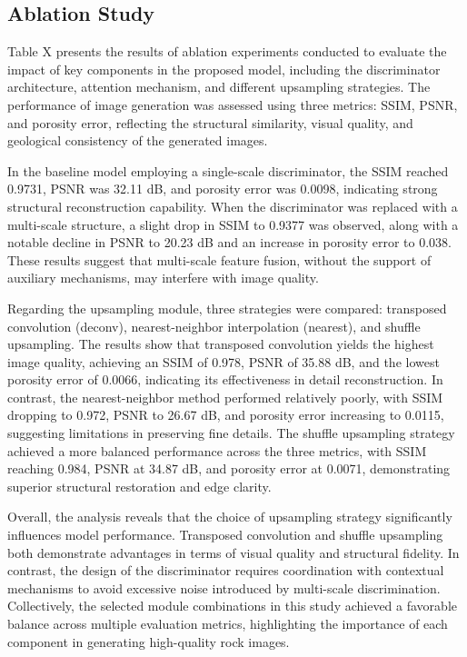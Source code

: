 \documentclass[a4paper,fleqn]{cas-sc}
\begin{document}
\subsection{Ablation Study}
Table X presents the results of ablation experiments conducted to evaluate the impact of key components in the proposed model, including the discriminator architecture, attention mechanism, and different upsampling strategies. The performance of image generation was assessed using three metrics: SSIM, PSNR, and porosity error, reflecting the structural similarity, visual quality, and geological consistency of the generated images.

In the baseline model employing a single-scale discriminator, the SSIM reached 0.9731, PSNR was 32.11 dB, and porosity error was 0.0098, indicating strong structural reconstruction capability. When the discriminator was replaced with a multi-scale structure, a slight drop in SSIM to 0.9377 was observed, along with a notable decline in PSNR to 20.23 dB and an increase in porosity error to 0.038. These results suggest that multi-scale feature fusion, without the support of auxiliary mechanisms, may interfere with image quality.

Regarding the upsampling module, three strategies were compared: transposed convolution (deconv), nearest-neighbor interpolation (nearest), and shuffle upsampling. The results show that transposed convolution yields the highest image quality, achieving an SSIM of 0.978, PSNR of 35.88 dB, and the lowest porosity error of 0.0066, indicating its effectiveness in detail reconstruction. In contrast, the nearest-neighbor method performed relatively poorly, with SSIM dropping to 0.972, PSNR to 26.67 dB, and porosity error increasing to 0.0115, suggesting limitations in preserving fine details. The shuffle upsampling strategy achieved a more balanced performance across the three metrics, with SSIM reaching 0.984, PSNR at 34.87 dB, and porosity error at 0.0071, demonstrating superior structural restoration and edge clarity.

Overall, the analysis reveals that the choice of upsampling strategy significantly influences model performance. Transposed convolution and shuffle upsampling both demonstrate advantages in terms of visual quality and structural fidelity. In contrast, the design of the discriminator requires coordination with contextual mechanisms to avoid excessive noise introduced by multi-scale discrimination. Collectively, the selected module combinations in this study achieved a favorable balance across multiple evaluation metrics, highlighting the importance of each component in generating high-quality rock images.
\end{document}
